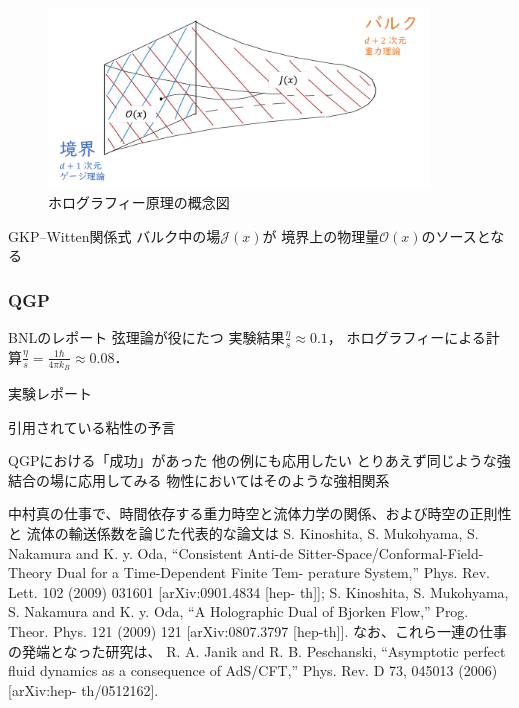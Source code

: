 \documentclass[b5paper,11pt,dvipdfmx]{jsarticle}
\numberwithin{equation}{section}
\theoremstyle{definition}
\begin{document}
\begin{figure}[t]
    \centering
    \includegraphics[width=0.9\textwidth]{holography.png}
    \caption{ホログラフィー原理の概念図}
    \label{fig:holography}
\end{figure}


GKP--Witten関係式
バルク中の場$\mathcal{J}(x)$が
境界上の物理量$\mathcal{O}(x)$のソースとなる
\cite{Gubser98,Witten98}


\subsubsection{QGP}
BNLのレポート
弦理論が役にたつ
実験結果$\frac{\eta}{s} \approx 0.1$，
ホログラフィーによる計算$\frac{\eta}{s} = \frac{1 \hbar}{4 \pi k_B} \approx 0.08$．

実験レポート
\cite{PHENIX06}

引用されている粘性の予言
\cite{Kovtun04}

QGPにおける「成功」があった
他の例にも応用したい
とりあえず同じような強結合の場に応用してみる
物性においてはそのような強相関系

中村真の仕事で、時間依存する重力時空と流体力学の関係、および時空の正則性と
流体の輸送係数を論じた代表的な論文は
S. Kinoshita, S. Mukohyama, S. Nakamura and K. y. Oda, “Consistent Anti-de
Sitter-Space/Conformal-Field-Theory Dual for a Time-Dependent Finite Tem-
perature System,” Phys. Rev. Lett. 102 (2009) 031601 [arXiv:0901.4834 [hep-
th]];
S. Kinoshita, S. Mukohyama, S. Nakamura and K. y. Oda, “A Holographic
Dual of Bjorken Flow,” Prog. Theor. Phys. 121 (2009) 121 [arXiv:0807.3797
[hep-th]].
なお、これら一連の仕事の発端となった研究は、
R. A. Janik and R. B. Peschanski, “Asymptotic perfect fluid dynamics as
a consequence of AdS/CFT,” Phys. Rev. D 73, 045013 (2006) [arXiv:hep-
th/0512162].
\end{document}
